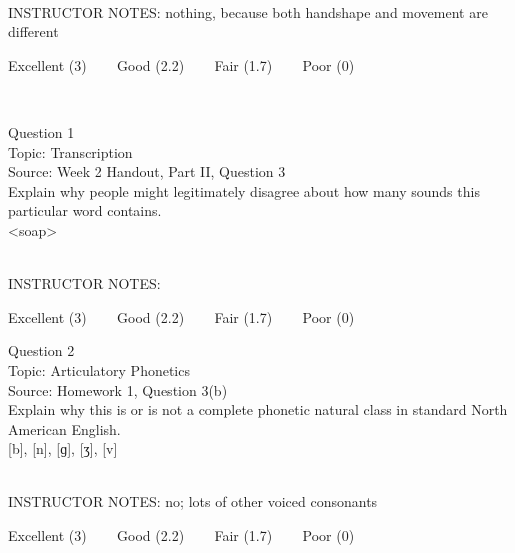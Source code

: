 \documentclass[12pt]{article}
\begin{document}
~\\
INSTRUCTOR NOTES: nothing, because both handshape and movement are different


\vfill
Excellent (3) ~~~ Good (2.2) ~~~ Fair (1.7) ~~~ Poor (0)
\newpage

\begin{center}
\textbf{{\color{red}{\HUGE END OF EXAM}}}\\

\end{center}
\newpage

\begin{center}
\textbf{{\color{blue}{\HUGE START OF EXAM\\}}}

\textbf{{\color{blue}{\HUGE Student ID: 56051\\}}}

\textbf{{\color{blue}{\HUGE \\}}}

\end{center}
\newpage

{\large Question 1}\\

Topic: Transcription\\
Source: Week 2 Handout, Part II, Question 3\\

Explain why people might legitimately disagree about how many sounds this particular word contains.\\

<soap>


~\\
INSTRUCTOR NOTES: 


\vfill
Excellent (3) ~~~ Good (2.2) ~~~ Fair (1.7) ~~~ Poor (0)
\newpage

{\large Question 2}\\

Topic: Articulatory Phonetics\\
Source: Homework 1, Question 3(b)\\

Explain why this is or is not a complete phonetic natural class in standard North American English.\\

{[b]}, {[n]}, {[ɡ]}, {[ʒ]}, {[v]}


~\\
INSTRUCTOR NOTES: no; lots of other voiced consonants


\vfill
Excellent (3) ~~~ Good (2.2) ~~~ Fair (1.7) ~~~ Poor (0)
\newpage
\end{document}
